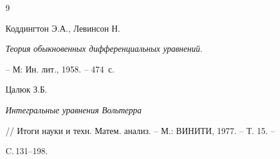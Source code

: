 \begin{thebibliography}{9}


Коддингтон Э.А., Левинсон Н. 


{\it Теория обыкновенных дифференциальных уравнений}.


-- М: Ин. лит., 1958. -- 474~с.




Цалюк З.Б.


{\it Интегральные уравнения Вольтерра}


// Итоги науки и техн. Матем. анализ. -- М.: ВИНИТИ, 1977. -- Т. 15. -- 


C.\,131--198.





\end{thebibliography}





\vskip 2cm












\label{end}


















































